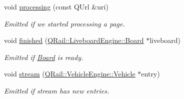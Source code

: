 \begin{DoxyCompactItemize}
void \mbox{\hyperlink{classQRail_1_1LiveboardEngine_1_1Factory_ab71b4c2d7d4f99fd4b12b0e92c0d8965}{processing}} (const Q\+Url \&uri)
\begin{DoxyCompactList}\small\item\em Emitted if we started processing a page. \end{DoxyCompactList}\item 
void \mbox{\hyperlink{classQRail_1_1LiveboardEngine_1_1Factory_a3a429744d6ed2685d62fe554dd2e84cb}{finished}} (\mbox{\hyperlink{classQRail_1_1LiveboardEngine_1_1Board}{Q\+Rail\+::\+Liveboard\+Engine\+::\+Board}} $\ast$liveboard)
\begin{DoxyCompactList}\small\item\em Emitted if \mbox{\hyperlink{classQRail_1_1LiveboardEngine_1_1Board}{Board}} is ready. \end{DoxyCompactList}\item 
void \mbox{\hyperlink{classQRail_1_1LiveboardEngine_1_1Factory_a554a8d4a9cdd0e0306763a003036ef93}{stream}} (\mbox{\hyperlink{classQRail_1_1VehicleEngine_1_1Vehicle}{Q\+Rail\+::\+Vehicle\+Engine\+::\+Vehicle}} $\ast$entry)
\begin{DoxyCompactList}\small\item\em Emitted if stream has new entries. \end{DoxyCompactList}\end{DoxyCompactItemize}
